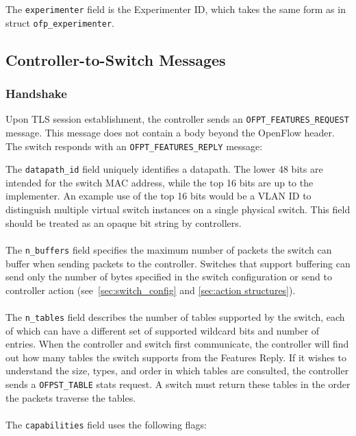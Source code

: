 
The \verb|experimenter| field is the Experimenter ID, which takes the same form as in struct \verb|ofp_experimenter|.

\subsection{Controller-to-Switch Messages}

\subsubsection{Handshake}
\label{cts:handshake} 
Upon TLS session establishment, the controller sends an \verb|OFPT_FEATURES_REQUEST| message.  This message does not contain a body beyond the OpenFlow header.  The switch responds with an \verb|OFPT_FEATURES_REPLY| message:


The \verb|datapath_id| field uniquely identifies a datapath.  The lower 48 bits are intended for the switch MAC address, while the top 16 bits are up to the implementer.  An example use of the top 16 bits would be a VLAN ID to distinguish multiple virtual switch instances on a single physical switch.  This field should be treated as an opaque bit string by controllers.
\\\\
The \verb|n_buffers| field specifies the maximum number of packets the switch can buffer when sending packets to the controller. Switches that support buffering can send only the number of bytes specified in the switch configuration or send to controller action (see~\ref{sec:switch_config} and \ref{sec:action structures}).
\\\\
The \verb|n_tables| field describes the number of tables supported by the switch, each of which can have a different set of supported wildcard bits and number of entries.  When the controller and switch first communicate, the controller will find out how many tables the switch supports from the Features Reply. If it wishes to understand the size, types, and order in which tables are consulted, the controller sends a \verb|OFPST_TABLE| stats request. A switch must return these tables in the order the packets traverse the tables.
\\\\
The \verb|capabilities| field uses the following flags:

 

